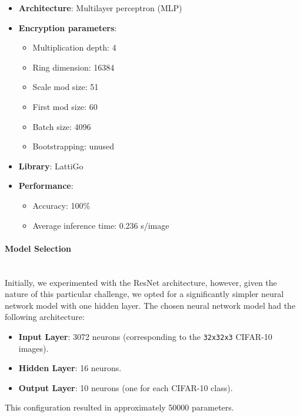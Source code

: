 \documentclass[article]{iacrtrans}
\begin{document}
\begin{itemize}
    \item \textbf{Architecture}: Multilayer perceptron (MLP)
    \item \textbf{Encryption parameters}: 
        \begin{itemize}
            \item Multiplication depth: 4
            \item Ring dimension: 16384
            \item Scale mod size: 51
            \item First mod size: 60
            \item Batch size: 4096
            \item Bootstrapping: unused
        \end{itemize}
    \item \textbf{Library}: LattiGo \cite{lattigo}
    \item \textbf{Performance}: 
        \begin{itemize}
            \item Accuracy: 100\%
            \item Average inference time: 0.236 s/image
        \end{itemize}
\end{itemize}

\paragraph{Model Selection}\mbox{}\\

Initially, we experimented with the ResNet architecture, however, given the nature of this particular challenge, we opted for a significantly simpler neural network model with one hidden layer. The chosen neural network model had the following architecture:

\begin{itemize}
    \item \textbf{Input Layer}: 3072 neurons (corresponding to the \verb|32x32x3| CIFAR-10 images).
    \item \textbf{Hidden Layer}: 16 neurons.
    \item \textbf{Output Layer}: 10 neurons (one for each CIFAR-10 class).
\end{itemize}
This configuration resulted in approximately 50000 parameters.
\end{document}
